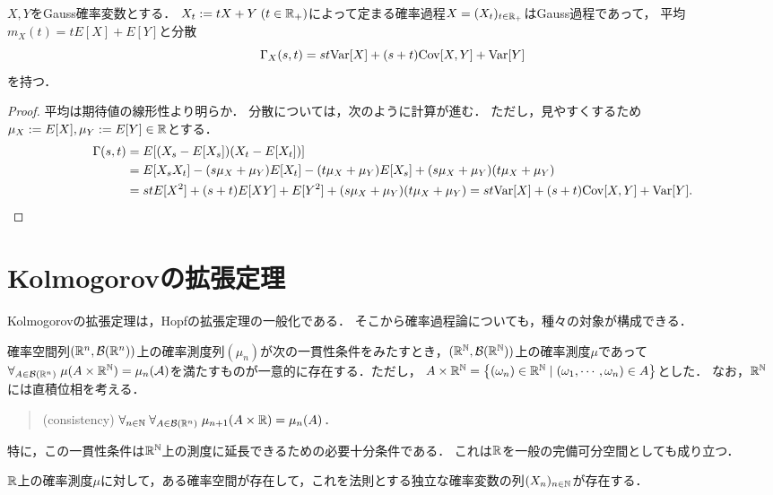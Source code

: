 \documentclass[uplatex,dvipdfmx]{jsreport}
\begin{document}
\begin{lemma}[共分散公式]
    $X,Y$をGauss確率変数とする．
    $X_t:=tX+Y\;(t\in\mathbb{R}_+)$によって定まる確率過程$X=(X_t)_{t\in\mathbb{R}_+}$はGauss過程であって，
    平均$m_X(t)=tE[X]+E[Y]$と分散
    \[\Gamma_X(s,t)=st\mathrm{Var}[X]+(s+t)\mathrm{Cov}[X,Y]+\mathrm{Var}[Y]\]
    を持つ．
\end{lemma}
\begin{proof}
    平均は期待値の線形性より明らか．
    分散については，次のように計算が進む．
    ただし，見やすくするため$\mu_X:=E[X],\mu_Y:=E[Y]\in\mathbb{R}$とする．
    \begin{align*}
        \Gamma(s,t)&=E[(X_s-E[X_s])(X_t-E[X_t])]\\
        &=E[X_sX_t]-(s\mu_X+\mu_Y)E[X_t]-(t\mu_X+\mu_Y)E[X_s]+(s\mu_X+\mu_Y)(t\mu_X+\mu_Y)\\
        &=stE[X^2]+(s+t)E[XY]+E[Y^2]+(s\mu_X+\mu_Y)(t\mu_X+\mu_Y)=st\mathrm{Var}[X]+(s+t)\mathrm{Cov}[X,Y]+\mathrm{Var}[Y].
    \end{align*}
\end{proof}

\section{Kolmogorovの拡張定理}

\begin{tcolorbox}[colframe=ForestGreen, colback=ForestGreen!10!white,breakable,colbacktitle=ForestGreen!40!white,coltitle=black,fonttitle=\bfseries\sffamily,
    title=]
    Kolmogorovの拡張定理は，Hopfの拡張定理の一般化である．
    そこから確率過程論についても，種々の対象が構成できる．
\end{tcolorbox}

\begin{theorem}
    確率空間列$(\mathbb{R}^n,\mathcal{B}(\mathbb{R}^n))$上の確率測度列$(\mu_n)$が次の一貫性条件をみたすとき，$(\mathbb{R}^{\mathbb{N}},\mathcal{B}(\mathbb{R}^{\mathbb{N}}))$上の確率測度$\mu$であって$\forall_{A\in\mathcal{B}(\mathbb{R}^n)}\;\mu(A\times\mathbb{R}^{\mathbb{N}})=\mu_n(\mathcal{A})$を満たすものが一意的に存在する．ただし，
    $A\times\mathbb{R}^{\mathbb{N}}=\left\{(\omega_n)\in\mathbb{R}^{\mathbb{N}}\mid (\omega_1,\cdots,\omega_n)\in A\right\}$とした．
    なお，$\mathbb{R}^{\mathbb{N}}$には直積位相を考える．
    \begin{quotation}
        (consistency) $\forall_{n\in\mathbb{N}}\;\forall_{A\in\mathcal{B}(\mathbb{R}^n)}\;\mu_{n+1}(A\times\mathbb{R})=\mu_n(A)$．
    \end{quotation}
    特に，この一貫性条件は$\mathbb{R}^{\mathbb{N}}$上の測度に延長できるための必要十分条件である．
    これは$\mathbb{R}$を一般の完備可分空間としても成り立つ．
\end{theorem}

\begin{corollary}
    $\mathbb{R}$上の確率測度$\mu$に対して，ある確率空間が存在して，これを法則とする独立な確率変数の列$(X_n)_{n\in\mathbb{N}}$が存在する．
\end{corollary}
\end{document}
